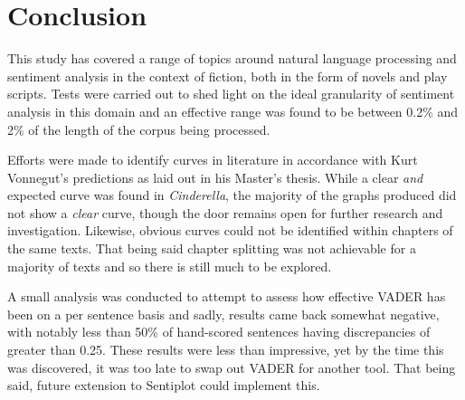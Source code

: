 \documentclass{article}
\begin{document}
\newpage
\section{Conclusion}
    This study has covered a range of topics around natural language processing and sentiment analysis in the context of fiction, both in the form of novels and play scripts. Tests were carried out to shed light on the ideal granularity of sentiment analysis in this domain and an effective range was found to be between 0.2\% and 2\% of the length of the corpus being processed.
    
    Efforts were made to identify curves in literature in accordance with Kurt Vonnegut's predictions as laid out in his Master's thesis. While a clear \textit{and} expected curve was found in \textit{Cinderella}, the majority of the graphs produced did not show a \textit{clear} curve, though the door remains open for further research and investigation. Likewise, obvious curves could not be identified within chapters of the same texts. That being said chapter splitting was not achievable for a majority of texts and so there is still much to be explored.
    
    A small analysis was conducted to attempt to assess how effective VADER has been on a per sentence basis and sadly, results came back somewhat negative, with notably less than 50\% of hand-scored sentences having discrepancies of greater than 0.25. These results were less than impressive, yet by the time this was discovered, it was too late to swap out VADER for another tool. That being said, future extension to Sentiplot could implement this.
    
\end{document}
